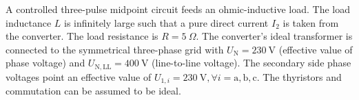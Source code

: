 

A controlled three-pulse midpoint circuit feeds an ohmic-inductive load. The load inductance $L$ is infinitely large such that a pure direct current $I_\mathrm{2}$ is taken from the converter. The load resistance is $R = \SI{5}{\Omega}$. The converter's ideal transformer is connected to the symmetrical three-phase grid with $U_\mathrm{N} = \SI{230}{\volt} $ (effective value of phase voltage) and  $U_\mathrm{N,LL} = \SI{400}{\volt} $ (line-to-line voltage). The secondary side phase voltages point an effective value of 
$U_{\mathrm{1},i} = \SI{230}{\volt}, \forall i=\mathrm{a,b,c}$. The thyristors and commutation can be assumed to be ideal.




